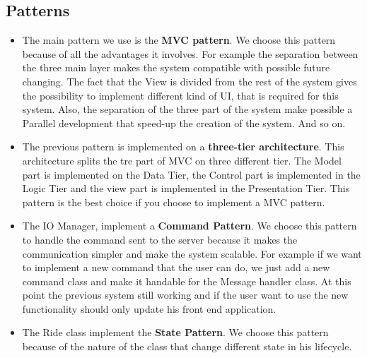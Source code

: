 \documentclass[../../../../dd.tex]{subfiles}
\begin{document}
		\subsection{Patterns}
			\begin{itemize}
				\item The main pattern we use is the \textbf{MVC pattern}. We choose this pattern because of all the advantages it involves. For example the separation between the three main layer makes the system compatible with possible future changing. The fact that the View is divided from the rest of the system gives the possibility to implement different kind of UI, that is required for this system. Also, the separation of the three part of the system make possible a Parallel development that speed-up the creation of the system. And so on.
				
				\item The previous pattern is implemented on a \textbf{three-tier architecture}. This architecture splits the tre part of MVC on three different tier. The Model part is implemented on the Data Tier, the Control part is implemented in the Logic Tier and the view part is implemented in the Presentation Tier. This pattern is the best choice if you choose to implement a MVC pattern.
				
				\item The IO Manager, implement a \textbf{Command Pattern}. We choose this pattern to handle the command sent to the server because it makes the communication simpler and make the system scalable. For example if we want to implement a new command that the user can do, we just add a new command class and make it handable for the Message handler class. At this point the previous system still working and if the user want to use the new functionality should only update his front end application.
				
				\item The Ride class implement the \textbf{State Pattern}. We choose this pattern because of the nature of the class that change different state in his lifecycle.
			
			\end{itemize}
\end{document}
